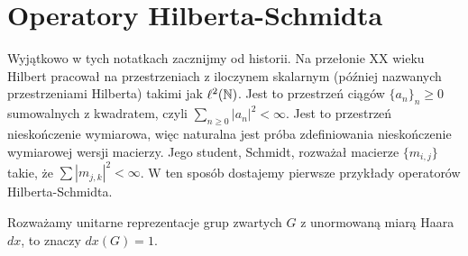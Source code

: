 \section{Operatory Hilberta-Schmidta}

Wyjątkowo w tych notatkach zacznijmy od historii. Na przełonie XX wieku Hilbert pracował na przestrzeniach z iloczynem skalarnym (później nazwanych przestrzeniami Hilberta) takimi jak $\ell^2(\mathbb{N})$. Jest to przestrzeń ciągów $\{a_n\}_n\geq 0$ sumowalnych z kwadratem, czyli $\sum_{n\geq0}|a_n|^2<\infty$. Jest to przestrzeń nieskończenie wymiarowa, więc naturalna jest próba zdefiniowania nieskończenie wymiarowej wersji macierzy. Jego student, Schmidt, rozważał macierze $\{m_{i,j}\}$ takie, że $\sum |m_{j,k}|^2<\infty$. W ten sposób dostajemy pierwsze przykłady operatorów Hilberta-Schmidta.

Rozważamy unitarne reprezentacje grup zwartych $G$ z unormowaną miarą Haara $dx$, to znaczy $dx(G)=1$.

%

